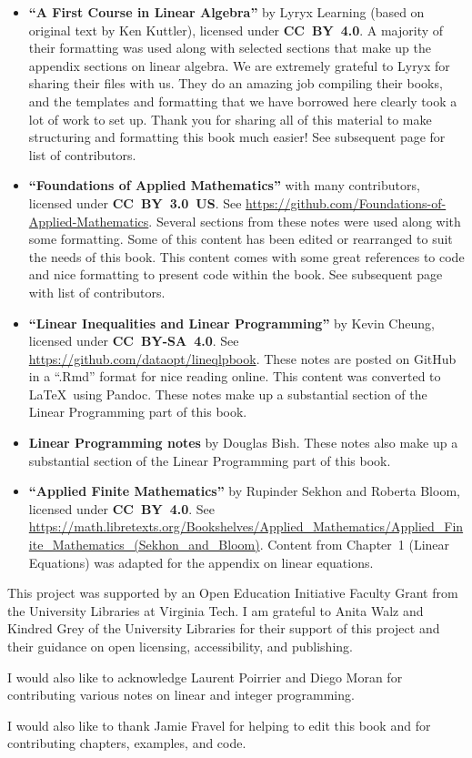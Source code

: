 \begin{itemize}
\item \textbf{``A First Course in Linear Algebra''} by Lyryx Learning (based on original text by Ken Kuttler), licensed under \textbf{CC~BY~4.0}.   A majority of their formatting was used along with selected sections that make up the appendix sections on linear algebra. We are extremely grateful to Lyryx for sharing their files with us.  They do an amazing job compiling their books, and the templates and formatting that we have borrowed here clearly took a lot of work to set up.  Thank you for sharing all of this material to make structuring and formatting this book much easier! See subsequent page for list of contributors.

\item \textbf{``Foundations of Applied Mathematics''} with many contributors, licensed under \textbf{CC~BY~3.0~US}.  See \url{https://github.com/Foundations-of-Applied-Mathematics}.  Several sections from these notes were used along with some formatting.  Some of this content has been edited or rearranged to suit the needs of this book.  This content comes with some great references to code and nice formatting to present code within the book.   See subsequent page with list of contributors.

\item \textbf{``Linear Inequalities and Linear Programming''} by
Kevin Cheung, licensed under \textbf{CC~BY-SA~4.0}.  See \url{https://github.com/dataopt/lineqlpbook}.  These notes are posted on GitHub in a ``.Rmd'' format for nice reading online.  This content was converted to \LaTeX\ using Pandoc.    These notes make up a substantial section of the Linear Programming part of this book.

\item \textbf{Linear Programming notes} by Douglas Bish.  These notes also make up a substantial section of the Linear Programming part of this book.

\item \textbf{``Applied Finite Mathematics''} by Rupinder Sekhon and Roberta Bloom, licensed under \textbf{CC~BY~4.0}.  See \url{https://math.libretexts.org/Bookshelves/Applied_Mathematics/Applied_Finite_Mathematics_(Sekhon_and_Bloom)}.  Content from Chapter~1 (Linear Equations) was adapted for the appendix on linear equations.
\end{itemize}

This project was supported by an Open Education Initiative Faculty Grant from the University Libraries at Virginia Tech.  I am grateful to Anita Walz and Kindred Grey of the University Libraries for their support of this project and their guidance on open licensing, accessibility, and publishing.

I would also like to acknowledge Laurent Poirrier and Diego Moran for contributing various notes on linear and integer programming.

I would also like to thank Jamie Fravel for helping to edit this book and for contributing chapters, examples, and code.

\newpage

